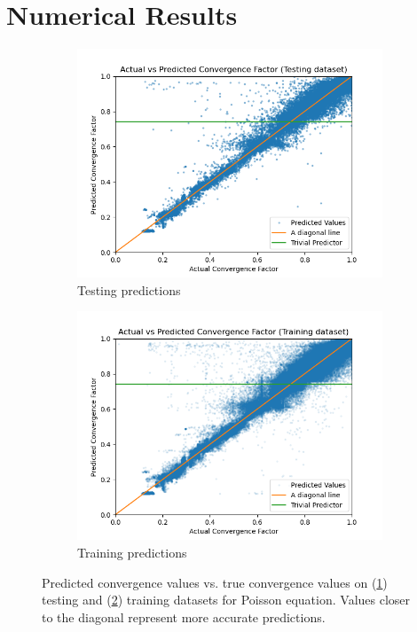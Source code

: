 \documentclass[review]{siamart190516}
\begin{document}
\section{Numerical Results}\label{sec:num}



\begin{figure}[h]
  \centering
  \begin{subfigure}{.48\textwidth}
    \includegraphics[width=\textwidth]{figs/poisson_conv_test_pred.png}
    \caption{Testing predictions}
    \label{subfig:poisson_conv_test}
  \end{subfigure}
  \begin{subfigure}{.48\textwidth}
    \includegraphics[width=\textwidth]{figs/poisson_conv_train_pred.png}
    \caption{Training predictions}
    \label{subfig:poisson_conv_train}
  \end{subfigure}
  \caption{Predicted convergence values vs. true convergence values on (\ref{subfig:poisson_conv_test}) testing and (\ref{subfig:poisson_conv_train}) training datasets for Poisson equation. Values closer to the diagonal represent more accurate predictions. }
  \label{fig:poisson_conv_pred}
\end{figure}
\end{document}
